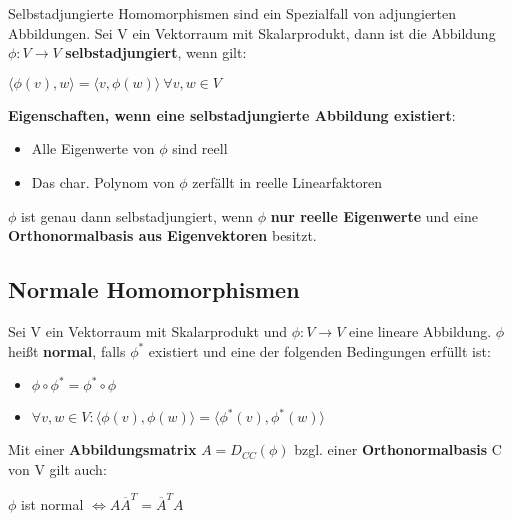 Selbstadjungierte Homomorphismen sind ein Spezialfall von adjungierten Abbildungen. Sei V ein Vektorraum mit Skalarprodukt, dann ist die Abbildung $\phi: V \rightarrow V$ \textbf{selbstadjungiert}, wenn gilt:
\begin{center}
	$\langle \phi(v), w\rangle = \langle v, \phi(w)\rangle\ \forall v, w\in V$
\end{center}
\textbf{Eigenschaften, wenn eine selbstadjungierte Abbildung existiert}:
\begin{itemize}
	\item Alle Eigenwerte von $\phi$ sind reell
	\item Das char. Polynom von $\phi$ zerfällt in reelle Linearfaktoren
\end{itemize}
$\phi$ ist genau dann selbstadjungiert, wenn $\phi$ \textbf{nur reelle Eigenwerte} und eine \textbf{Orthonormalbasis aus Eigenvektoren} besitzt.

\subsection{Normale Homomorphismen}%
\label{aa:sub:normale_homomorphismen}

Sei V ein Vektorraum mit Skalarprodukt und $\phi: V \rightarrow V$ eine lineare Abbildung. $\phi$ heißt \textbf{normal}, falls $\phi^*$ existiert und eine der folgenden Bedingungen erfüllt ist:
\begin{itemize}
	\item $\phi \circ \phi^* = \phi^* \circ \phi$
	\item $\forall v,w \in V: \langle \phi(v), \phi(w)\rangle = \langle \phi^*(v), \phi^*(w)\rangle$
\end{itemize}
Mit einer \textbf{Abbildungsmatrix} $A = D_{CC}(\phi)$ bzgl. einer \textbf{Orthonormalbasis} C von V gilt auch:
\begin{center}
	$\phi$ ist normal $\Leftrightarrow A \overline{A}^T = \overline{A}^TA$
\end{center}